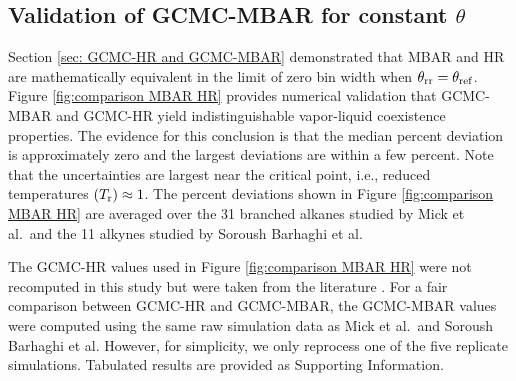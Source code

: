 \documentclass[journal=jced,manuscript=article]{achemso}
\begin{document}

\subsection{Validation of GCMC-MBAR for constant $\theta$} \label{sec: Constant theta} 

Section \ref{sec: GCMC-HR and GCMC-MBAR} demonstrated that MBAR and HR are mathematically equivalent in the limit of zero bin width when $\theta_{\rm rr} = \theta_{\rm ref}$. Figure \ref{fig:comparison MBAR HR} provides numerical validation that GCMC-MBAR and GCMC-HR yield indistinguishable vapor-liquid coexistence properties. The evidence for this conclusion is that the median percent deviation is approximately zero and the largest deviations are within a few percent. Note that the uncertainties are largest near the critical point, i.e., reduced temperatures $(T_{\rm r}) \approx 1$. The percent deviations shown in Figure \ref{fig:comparison MBAR HR} are averaged over the 31 branched alkanes studied by Mick et al.~and the 11 alkynes studied by Soroush Barhaghi et al. 

The GCMC-HR values used in Figure \ref{fig:comparison MBAR HR} were not recomputed in this study but were taken from the literature \cite{Potoff_branched,Barhaghi2017}. For a fair comparison between GCMC-HR and GCMC-MBAR, the GCMC-MBAR values were computed using the same raw simulation data as Mick et al.~and Soroush Barhaghi et al. However, for simplicity, we only reprocess one of the five replicate simulations. Tabulated results are provided as Supporting Information.

\end{document}
